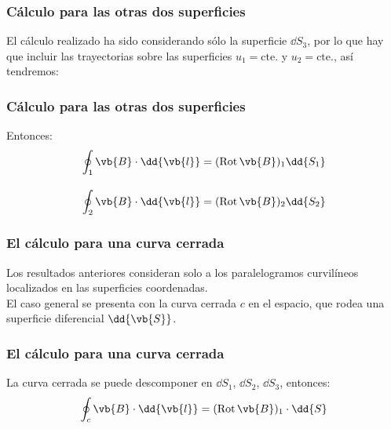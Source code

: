 \begin{frame}
\frametitle{Cálculo para las otras dos superficies}
El cálculo realizado ha sido considerando sólo la superficie $\dd{S_{3}}$, por lo que hay que incluir las trayectorias sobre las superficies $u_{1} = \mbox{cte.}$ y $u_{2} = \mbox{cte.}$, así tendremos:
\end{frame}
\begin{frame}
\frametitle{Cálculo para las otras dos superficies}
Entonces:
\begin{align*}
\oint_{1} \vb{B} \cdot \dd{\vb{l}} &= ({\rm{Rot}} \, \vb{B})_{1} \dd{S_{1}} \\[1em]
\oint_{2} \vb{B} \cdot \dd{\vb{l}} &= ({\rm{Rot}} \, \vb{B})_{2} \dd{S_{2}}
\end{align*}
\end{frame}
\begin{frame}
\frametitle{El cálculo para una curva cerrada}
Los resultados anteriores consideran solo a los paralelogramos curvilíneos localizados en las superficies coordenadas.
\\
\bigskip
El caso general se presenta con la curva cerrada $c$ en el espacio, que rodea una superficie diferencial $\dd{\vb{S}}$.
\end{frame}
\begin{frame}
\frametitle{El cálculo para una curva cerrada}
La curva cerrada se puede descomponer en $\dd{S_{1}}$, $\dd{S_{2}}$, $\dd{S_{3}}$, entonces:
\begin{align*}
\oint_{c} \vb{B} \cdot \dd{\vb{l}} = ({\rm{Rot}} \, \vb{B})_{1} \cdot \dd{S} 
\end{align*}
\end{frame}
